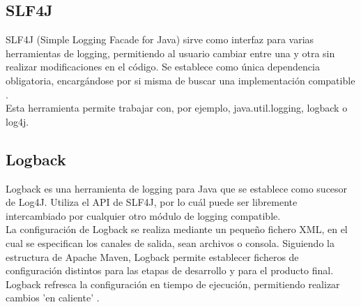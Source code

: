 \subsection{SLF4J}

SLF4J (Simple Logging Facade for Java) sirve como interfaz para varias herramientas de logging, permitiendo al usuario cambiar entre una y otra sin realizar modificaciones en el código.
Se establece como única dependencia obligatoria, encargándose por si misma de buscar una implementación compatible \cite{website:slf4j}.
\\
Esta herramienta permite trabajar con, por ejemplo, java.util.logging, logback o log4j.

\subsection{Logback}

Logback es una herramienta de logging para Java que se establece como sucesor de Log4J.
Utiliza el API de SLF4J, por lo cuál puede ser libremente intercambiado por cualquier otro módulo de logging compatible.
\\
La configuración de Logback se realiza mediante un pequeño fichero XML, en el cual se especifican los canales de salida, sean archivos o consola.
Siguiendo la estructura de Apache Maven, Logback permite establecer ficheros de configuración distintos para las etapas de desarrollo y para el producto final.
Logback refresca la configuración en tiempo de ejecución, permitiendo realizar cambios 'en caliente' \cite{website:logback}.